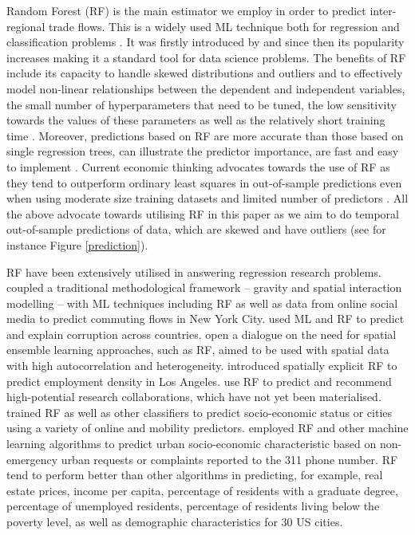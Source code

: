 \documentclass[]{interact}
\theoremstyle{plain}%
\theoremstyle{definition}
\theoremstyle{remark}
\begin{document}
Random Forest (RF) is the main estimator we employ in order to predict
inter-regional trade flows. This is a widely used ML technique both for
regression and classification problems \citep{biau2012analysis}. It was
firstly introduced by \citet{breiman2001random} and since then its
popularity increases making it a standard tool for data science
problems. The benefits of RF include its capacity to handle skewed
distributions and outliers and to effectively model non-linear
relationships between the dependent and independent variables, the small
number of hyperparameters that need to be tuned, the low sensitivity
towards the values of these parameters as well as the relatively short
training time \citep{Caruana2008, liaw2002classification, yan2020using}.
Moreover, predictions based on RF are more accurate than those based on
single regression trees, can illustrate the predictor importance, are
fast and easy to implement
\citep{breiman2001random, sulaiman2011intelligent, pourebrahim2019trip, biau2012analysis}.
Current economic thinking advocates towards the use of RF as they tend
to outperform ordinary least squares in out-of-sample predictions even
when using moderate size training datasets and limited number of
predictors \citep{mullainathan2017machine, athey2019machine}. All the
above advocate towards utilising RF in this paper as we aim to do
temporal out-of-sample predictions of data, which are skewed and have
outliers (see for instance Figure \ref{prediction}).

RF have been extensively utilised in answering regression research
problems. \citet{pourebrahim2019trip} coupled a traditional
methodological framework -- gravity and spatial interaction modelling --
with ML techniques including RF as well as data from online social media
to predict commuting flows in New York City. \citet{lima2020predicting}
used ML and RF to predict and explain corruption across countries.
\citet{sinha2019assessing} open a dialogue on the need for spatial
ensemble learning approaches, such as RF, aimed to be used with spatial
data with high autocorrelation and heterogeneity. \citet{creditspatial}
introduced spatially explicit RF to predict employment density in Los
Angeles. \citet{guns2014recommending} use RF to predict and recommend
high-potential research collaborations, which have not yet been
materialised. \citet{ren2019predicting} trained RF as well as other
classifiers to predict socio-economic status or cities using a variety
of online and mobility predictors. \citet{wang2017structure} employed RF
and other machine learning algorithms to predict urban socio-economic
characteristic based on non-emergency urban requests or complaints
reported to the 311 phone number. RF tend to perform better than other
algorithms in predicting, for example, real estate prices, income per
capita, percentage of residents with a graduate degree, percentage of
unemployed residents, percentage of residents living below the poverty
level, as well as demographic characteristics for 30 US cities.
\end{document}
